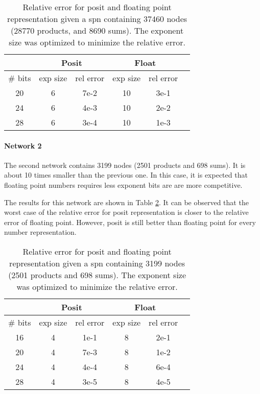 \begin{table}[!ht]
	\centering
	\caption{Relative error for posit and floating point representation given a \gls{spn} containing 37460 nodes (28770 products, and 8690 sums). The exponent size was optimized to minimize the relative error.}
	\label{tab:net1_res}
	\begin{tabular}{|c||c|c|c||c|c|}
	\hline
		& \multicolumn{2}{c||}{Posit} &  \multicolumn{2}{c|}{Float} \\
	\hline
		\# bits & exp size & rel error & exp size & rel error \\
	\hline
		20 & 6 & 7e-2 & 10 & 3e-1 \\
		24 & 6 & 4e-3 & 10 & 2e-2 \\
		28 & 6 & 3e-4 & 10 & 1e-3 \\
	\hline
	\end{tabular}
\end{table}


\paragraph{Network 2}

The second network contains 3199 nodes (2501 products and 698 sums). It is about 10 times smaller than the previous one. In this case, it is expected that floating point numbers requires less exponent bits are are more competitive.

The results for this network are shown in Table \ref{tab:net2_res}. It can be observed that the worst case of the relative error for posit representation is closer to the relative error of floating point. However, posit is still better than floating point for every number representation.

\begin{table}[!ht]
	\centering
	\caption{Relative error for posit and floating point representation given a \gls{spn} containing 3199 nodes (2501 products and 698 sums). The exponent size was optimized to minimize the relative error.}
	\label{tab:net2_res}
	\begin{tabular}{|c||c|c||	c|c|c|}
	\hline
		& \multicolumn{2}{c||}{Posit} &  \multicolumn{2}{c|}{Float} \\
	\hline
		\# bits & exp size & rel error & exp size & rel error \\
	\hline
		16 & 4 & 1e-1 & 8 & 2e-1 \\
		20 & 4 & 7e-3 & 8 & 1e-2 \\
		24 & 4 & 4e-4 & 8 & 6e-4 \\
		28 & 4 & 3e-5 & 8 & 4e-5 \\
	\hline
	\end{tabular}
\end{table}


